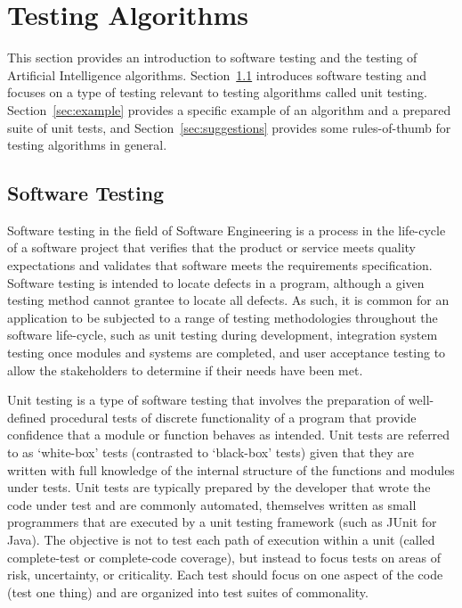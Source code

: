
\section{Testing Algorithms} 
\label{advanced:sec:testing_algorithms}

This section provides an introduction to software testing and the testing of Artificial Intelligence algorithms. Section~\ref{sec:testing} introduces software testing and focuses on a type of testing relevant to testing algorithms called unit testing. Section~\ref{sec:example} provides a specific example of an algorithm and a prepared suite of unit tests, and Section~\ref{sec:suggestions} provides some rules-of-thumb for testing algorithms in general.


%
%
\subsection{Software Testing}
\label{sec:testing}
Software testing in the field of Software Engineering is a process in the life-cycle of a software project that verifies that the product or service meets quality expectations and validates that software meets the requirements specification. Software testing is intended to locate defects in a program, although a given testing method cannot grantee to locate all defects. As such, it is common for an application to be subjected to a range of testing methodologies throughout the software life-cycle, such as unit testing during development, integration system testing once modules and systems are completed, and user acceptance testing to allow the stakeholders to determine if their needs have been met.

Unit testing is a type of software testing that involves the preparation of well-defined procedural tests of discrete functionality of a program that provide confidence that a module or function behaves as intended. Unit tests are referred to as `white-box' tests (contrasted to `black-box' tests) given that they are written with full knowledge of the internal structure of the functions and modules under tests. Unit tests are typically prepared by the developer that wrote the code under test and are commonly automated, themselves written as small programmers that are executed by a unit testing framework (such as JUnit for Java). The objective is not to test each path of execution within a unit (called complete-test or complete-code coverage), but instead to focus tests on areas of risk, uncertainty, or criticality. Each test should focus on one aspect of the code (test one thing) and are organized into test suites of commonality. 

